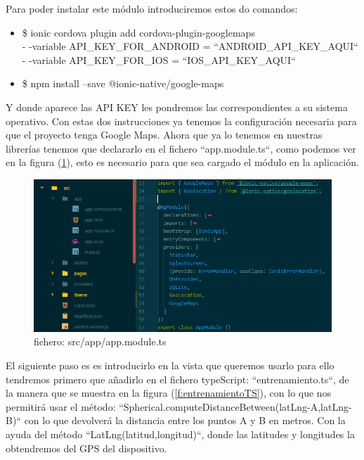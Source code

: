 \documentclass[a4paper, 11pt]{article}
\begin{document}
\begin{itemize}
              Para poder instalar este módulo introduciremos estos do comandos:\\
                \begin{itemize}
                    \item{\$ ionic cordova plugin add cordova-plugin-googlemaps\\
                    - -variable API\_KEY\_FOR\_ANDROID = ``ANDROID\_API\_KEY\_AQUI``\\
                    - -variable API\_KEY\_FOR\_IOS = ``IOS\_API\_KEY\_AQUI`` }
                    \item{\$ npm install --save @ionic-native/google-maps}
                \end{itemize}

               Y donde aparece las API KEY les pondremos las correspondientes a
               su sistema operativo. Con estas dos instrucciones ya tenemos la
               configuración necesaria para que el proyecto tenga Google Maps.
               Ahora que ya lo tenemos en nuestras librerías tenemos que
               declararlo en el fichero ``app.module.ts``, como podemos ver en
               la figura (\ref{f:module.ts}), esto es necesario para que sea
               cargado el módulo en la aplicación.\\

               \begin{figure}[H]
                 \centering
                      \includegraphics[width=\textwidth]{geolocalizacion-googlemaps}
                      \caption{fichero: src/app/app.module.ts}
                      \label{f:module.ts}
                \end{figure}

               El siguiente paso es es introducirlo en la vista que queremos
               usarlo para ello tendremos primero que añadirlo en el fichero
               typeScript: ``entrenamiento.ts``, de la manera que se muestra en
               la figura (\ref{f:entrenamientoTS}), con lo que nos permitirá
               usar el método: ``Spherical.computeDistanceBetween(latLng-A,latLng-B)``
               con lo que devolverá la distancia entre los puntos A y B en metros.
               Con la ayuda del método ``LatLng(latitud,longitud)``, donde las
               latitudes y longitudes la obtendremos del GPS del dispositivo.\\


\end{itemize}
\end{document}
